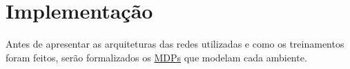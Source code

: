 


\chapter{Implementação}
\label{cap:implementacao}


Antes de apresentar as arquiteturas das redes utilizadas e como os treinamentos foram feitos, serão formalizados os \hyperref[sec:mdp]{MDPs} que modelam cada ambiente.

